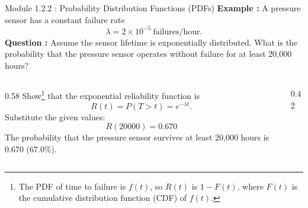 \documentclass{beamer}
\begin{document}
\begin{frame}{Module 1.2.2 : Probability Distribution Functions (PDFs)}
\scriptsize
\textbf{Example : }
A pressure sensor has a constant failure rate
\begin{equation}
\lambda = 2\times10^{-5}\ \text{failures/hour}.
\end{equation}
\textbf{Question : } Assume the sensor lifetime is exponentially distributed.  What is the probability that the pressure sensor operates without failure for at least 20,000 hours? \\ \vspace{0.5cm}
\begin{columns}
\begin{column}{0.58\textwidth}
\scriptsize
Show\footnote{\scriptsize The PDF of time to failure is $f(t)$, so $R(t)$ is $1-F(t)$, where $F(t)$ is the cumulative distribution function (CDF) of $f(t)$.} that the exponential reliability function is
\begin{equation}
R(t)=P(T>t)=e^{-\lambda t}.
\end{equation}
Substitute the given values:
\begin{equation}
\boxed{R(20000)=0.670}
\end{equation}
The probability that the pressure sensor survives at least 20,000 hours is 0.670 (67.0\%).
\end{column}
\begin{column}{0.42\textwidth}
\centering
{}
\end{column}
\end{columns}
\end{frame}
\end{document}
